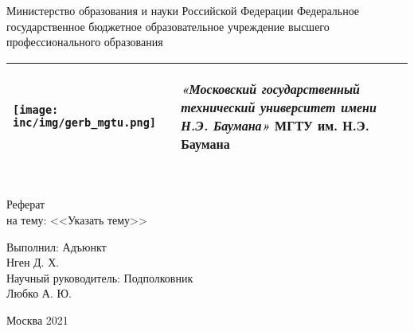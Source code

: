 \begin{center} 
\begin{small}
	Министерство образования и науки Российской Федерации
	Федеральное государственное бюджетное образовательное учреждение высшего профессионального образования\\
\end{small}

\setlength{\arrayrulewidth}{0.8mm}
\begin{tabular}{m{3cm}m{13cm}}
	\texttt{[image: inc/img/gerb\_mgtu.png]} & 
	\begin{center}
	\textbf {\textit{«Московский государственный технический университет имени Н.Э. Баумана»}}
	\newline \large \textbf{МГТУ им. Н.Э. Баумана}
	\end{center}\\
	 
	

\hline
\end{tabular}

\\[4.0cm] 

\huge Реферат \\[0.6cm] %
\large на тему:  <<Указать тему>>\\[3.7cm]

\end{center} 

\begin{flushright}
Выполнил: Адъюнкт  \\
Нген Д. Х. \\
Научный руководитель: Подполковник\\
Любко А. Ю.\\
\end{flushright}


\vfill 

\begin{center} 
\large Москва 2021
\end{center} 

\thispagestyle{empty}